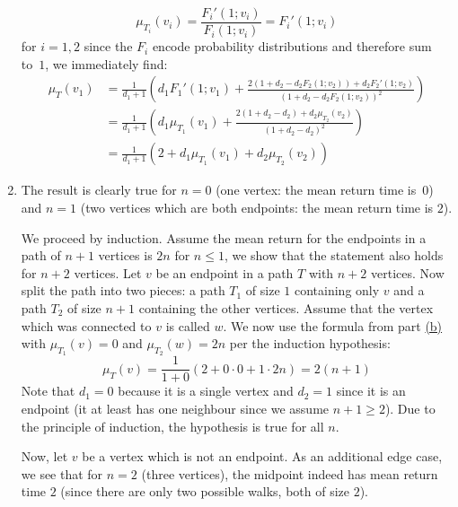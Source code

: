 \begin{solution}
\begin{enumerate}[label=(\alph*)]
        \[
            \mu_{T_i}(v_i) = \frac{F_i'(1;v_i)}{F_i(1;v_i)} = F_i'(1;v_i)
        \]
        for $i=1,2$ since the $F_i$ encode probability distributions and therefore sum to~$1$, we immediately find:
        \begin{align*}
            \mu_T(v_1) &= \frac{1}{d_1+1} \left(d_1F_1'(1;v_1) + \frac{2(1+d_2-d_2F_2(1;v_2)) + d_2F_2'(1;v_2)}{(1+d_2-d_2F_2(1;v_2))^2} \right) \\
            &= \frac{1}{d_1+1}  \left(d_1\mu_{T_1}(v_1) + \frac{2(1+d_2-d_2) +d_2\mu_{T_2}(v_2)}{(1+d_2-d_2)^2}\right) \\
            &= \frac{1}{d_1+1}(2+d_1\mu_{T_1}(v_1) + d_2\mu_{T_2}(v_2))
        \end{align*}
        \item The result is clearly true for $n=0$ (one vertex: the mean return time is~$0$) and $n=1$ (two vertices which are both endpoints: the mean return time is $2$).
        
        We proceed by induction. Assume the mean return for the endpoints in a path of $n+1$ vertices is $2n$ for $n\leq 1$, we show that the statement also holds for $n+2$ vertices. Let $v$ be an endpoint in a path $T$ with $n+2$ vertices. Now split the path into two pieces: a path $T_1$ of size $1$ containing only $v$ and a path $T_2$ of size $n+1$ containing the other vertices. Assume that the vertex which was connected to $v$ is called $w$. We now use the formula from part \hyperlink{eq:ch4:3:b}{(b)} with $\mu_{T_1}(v) = 0$ and $\mu_{T_2}(w) = 2n$ per the induction hypothesis:
        \[
            \mu_T(v) = \frac{1}{1+0} (2 + 0\cdot 0 + 1\cdot2n) = 2(n+1)
        \]
        Note that $d_1= 0$ because it is a single vertex and $d_2=1$ since it is an endpoint (it at least has one neighbour since we assume $n+1 \geq 2$). Due to the principle of induction, the hypothesis is true for all $n$.  

        Now, let $v$ be a vertex which is not an endpoint. As an additional edge case, we see that for $n=2$ (three vertices), the midpoint indeed has mean return time $2$ (since there are only two possible walks, both of size $2$).


\end{enumerate}
\end{solution}
